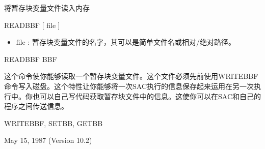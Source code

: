 \label{cmd:readbbf}

将暂存块变量文件读入内存

READBBF [ file ]

\begin{itemize}
\item file : 暂存块变量文件的名字，其可以是简单文件名或相对/绝对路径。
\end{itemize}

READBBF BBF

这个命令使你能够读取一个暂存块变量文件。这个文件必须先前使用WRITEBBF命令写入磁盘。这个特性让你能够将一次SAC执行的信息保存起来运用在另一次执行中。你也可以自己写代码获取暂存块文件中的信息。这使你可以在SAC和自己的程序之间传送信息。

WRITEBBF, SETBB, GETBB

May 15, 1987 (Version 10.2)

